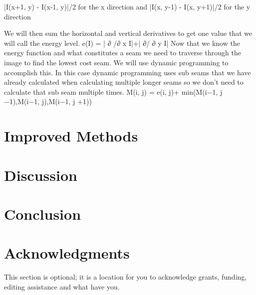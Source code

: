\documentclass{sig-alternate}
\begin{document}
|I(x+1, y) - I(x-1, y)|/2 for the x direction and |I(x, y-1) - I(x, y+1)|/2 for the y direction

\cite{Avidan:2007:SCC:1276377.1276390}

We will then sum the horizontal and vertical derivatives to get one value that we will call the energy level. 
e(I) = | ∂ /∂ x I|+| ∂/ ∂ y I|
Now that we know the energy function and what constitutes a seam we need to traverse through the image to find the lowest cost seam. We will use dynamic programming to accomplish this. In this case dynamic programming uses sub seams that we have already calculated when calculating multiple longer seams so we don’t need to calculate that sub seam multiple times.
M(i, j) = e(i, j)+ min(M(i−1, j −1),M(i−1, j),M(i−1, j +1)) 
\cite{Garey:1979}

\section{Improved Methods}
\label{sec:improvedMethods}

\section{Discussion}
\label{sec:discussion}

\section{Conclusion}
\label{sec:conclusion}


\section*{Acknowledgments}
\label{sec:acknowledgments}

This section is optional; it is a location for you
to acknowledge grants, funding, editing assistance and
what have you.


  
\end{document}
